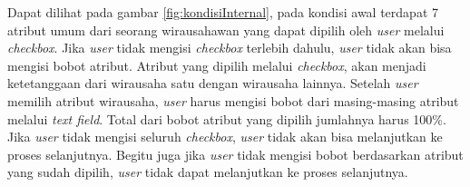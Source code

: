 Dapat dilihat pada gambar \ref{fig:kondisiInternal}, pada kondisi awal terdapat 7 atribut umum dari seorang wirausahawan yang dapat dipilih oleh \textit{user} melalui \textit{checkbox}. Jika \textit{user} tidak mengisi \textit{checkbox} terlebih dahulu, \textit{user} tidak akan bisa mengisi bobot atribut. Atribut yang dipilih melalui \textit{checkbox}, akan menjadi ketetanggaan dari wirausaha satu dengan wirausaha lainnya. Setelah \textit{user} memilih atribut wirausaha, \textit{user} harus mengisi bobot dari masing-masing atribut melalui \textit{text field}. Total dari bobot atribut yang dipilih jumlahnya harus 100\%. Jika \textit{user} tidak mengisi seluruh  \textit{checkbox}, \textit{user} tidak akan bisa melanjutkan ke proses selanjutnya. Begitu juga jika \textit{user} tidak mengisi bobot berdasarkan atribut yang sudah dipilih, \textit{user} tidak dapat melanjutkan ke proses selanjutnya.
